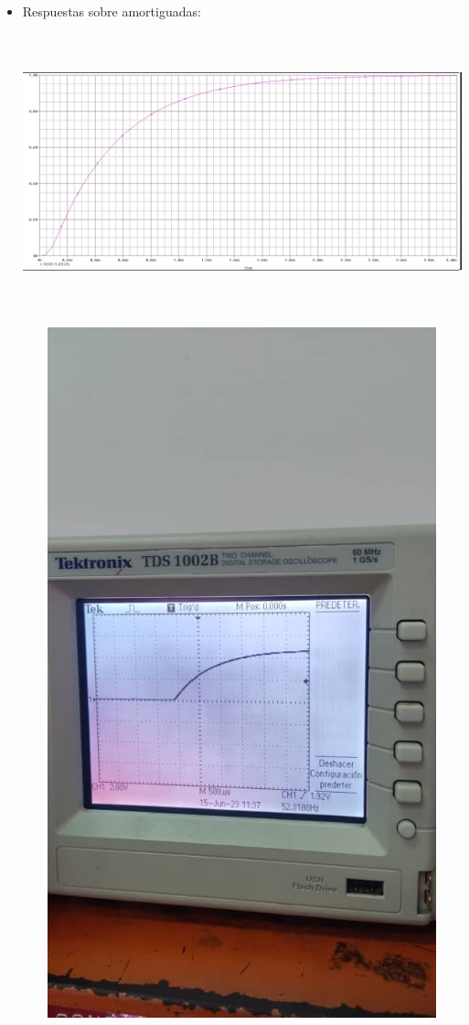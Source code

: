 \documentclass[12pt]{article}
\begin{document}
\begin{enumerate}
\begin{itemize}
    		\item Respuestas sobre amortiguadas:
    		
    		\begin{center}
    			\includegraphics[width=16cm,height=8cm]{Img/sobreamor_1}
    		\end{center}
    		
    		\begin{center}
    			\includegraphics[width=16cm,height=20cm]{Img/sobreamor_lab1}
    		\end{center}
    		

\end{itemize}
\end{enumerate}
\end{document}
